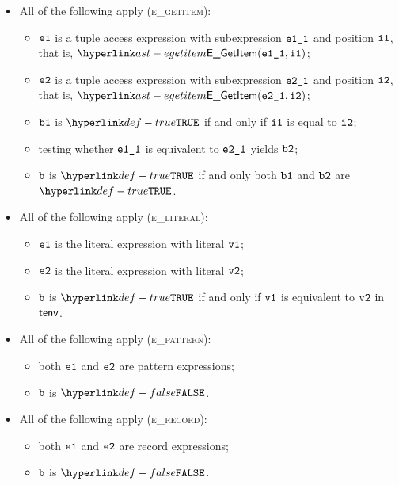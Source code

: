 \begin{itemize}
  \item All of the following apply (\textsc{e\_getitem}):
  \begin{itemize}
    \item $\texttt{e1}$ is a tuple access expression with subexpression $\texttt{e1\_1}$ and position $\texttt{i1}$,
          that is, $\EGetItem(\veoneone, \vione)$;
    \item $\texttt{e2}$ is a tuple access expression with subexpression $\texttt{e2\_1}$ and position $\texttt{i2}$,
          that is, $\EGetItem(\vetwoone, \vitwo)$;
    \item $\texttt{b1}$ is $\True$ if and only if $\texttt{i1}$ is equal to $\texttt{i2}$;
    \item testing whether $\texttt{e1\_1}$ is equivalent to $\texttt{e2\_1}$ yields $\texttt{b2}$\ProseOrTypeError;
    \item $\texttt{b}$ is $\True$ if and only both $\texttt{b1}$ and $\texttt{b2}$ are $\True$.
  \end{itemize}

  \item All of the following apply (\textsc{e\_literal}):
  \begin{itemize}
    \item $\texttt{e1}$ is the literal expression with literal $\texttt{v1}$;
    \item $\texttt{e2}$ is the literal expression with literal $\texttt{v2}$;
    \item $\texttt{b}$ is $\True$ if and only if $\texttt{v1}$ is equivalent to $\texttt{v2}$ in $\textsf{tenv}$.
  \end{itemize}

  \item All of the following apply (\textsc{e\_pattern}):
  \begin{itemize}
    \item both $\texttt{e1}$ and $\texttt{e2}$ are pattern expressions;
    \item $\texttt{b}$ is $\False$.
  \end{itemize}

  \item All of the following apply (\textsc{e\_record}):
  \begin{itemize}
    \item both $\texttt{e1}$ and $\texttt{e2}$ are record expressions;
    \item $\texttt{b}$ is $\False$.
  \end{itemize}


\end{itemize}
